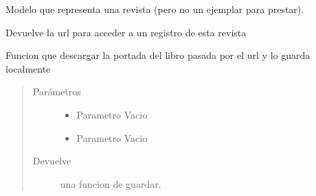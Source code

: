 \documentclass[letterpaper,10pt,spanish]{sphinxmanual}
\begin{document}
\begin{fulllineitems}
\label{\detokenize{modules/revista/models:revista.models.Revista}}
Modelo que representa una revista (pero no un ejemplar para prestar).

\begin{fulllineitems}
\label{\detokenize{modules/revista/models:revista.models.Revista.DoesNotExist}}
\end{fulllineitems}


\begin{fulllineitems}
\label{\detokenize{modules/revista/models:revista.models.Revista.MultipleObjectsReturned}}
\end{fulllineitems}


\begin{fulllineitems}
\label{\detokenize{modules/revista/models:revista.models.Revista.get_absolute_url}}
Devuelve la url para acceder a un registro de esta revista

\end{fulllineitems}


\begin{fulllineitems}
\label{\detokenize{modules/revista/models:revista.models.Revista.save}}
Funcion que descargar la portada del libro pasada por el url y lo guarda localmente
\begin{quote}\begin{description}
\item[{Parámetros}] \leavevmode\begin{itemize}
\item {} 
 \textendash{} Parametro Vacio

\item {} 
 \textendash{} Parametro Vacio

\end{itemize}

\item[{Devuelve}] \leavevmode
una funcion de guardar.

\end{description}\end{quote}

\end{fulllineitems}


\end{fulllineitems}
\end{document}
